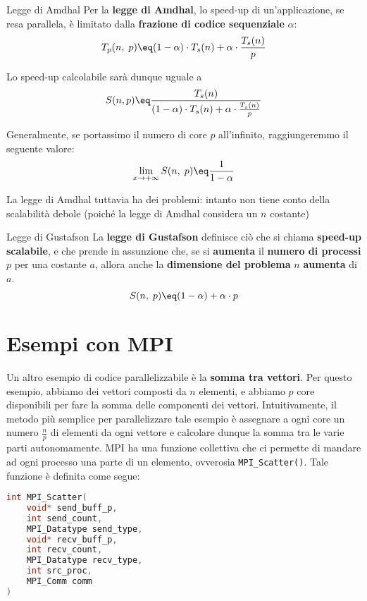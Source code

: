 \begin{definition}{Legge di Amdhal}
    Per la \textbf{legge di Amdhal}, lo speed-up di un'applicazione, se resa parallela, è limitato dalla \textbf{frazione di codice sequenziale} $\alpha$:
    \[ T_p(n, \; p) \eq (1 - \alpha) \cdot T_s(n) + \alpha \cdot \frac{T_s(n)}{p} \]

    Lo speed-up calcolabile sarà dunque uguale a
    \[ S(n, p) \eq \frac{T_s(n)}{(1 - \alpha) \cdot T_s(n) + \alpha \cdot \frac{T_s(n)}{p}} \]
\end{definition}

Generalmente, se portassimo il numero di core $p$ all'infinito, raggiungeremmo il seguente valore:
\[ \lim_{x \to +\infty} S(n, \; p) \eq \frac{1}{1 - \alpha} \]

\noindent La legge di Amdhal tuttavia ha dei problemi: intanto non tiene conto della scalabilità debole (poiché la legge di Amdhal considera un $n$ costante) %

\begin{definition}{Legge di Gustafson}
    La \textbf{legge di Gustafson} definisce ciò che si chiama \textbf{speed-up scalabile}, e che prende in assunzione che, se si \textbf{aumenta} il \textbf{numero di processi} $p$ per una costante $a$, allora anche la \textbf{dimensione del problema} $n$ \textbf{aumenta} di $a$.
    \[ S(n, \; p) \eq (1 - \alpha) + \alpha \cdot p \]
\end{definition}

\section{Esempi con MPI}


Un altro esempio di codice parallelizzabile è la \textbf{somma tra vettori}. Per questo esempio, abbiamo dei vettori composti da $n$ elementi, e abbiamo $p$ core disponibili per fare la somma delle componenti dei vettori. Intuitivamente, il metodo più semplice per parallelizzare tale esempio è assegnare a ogni core un numero $\frac{n}{p}$ di elementi da ogni vettore e calcolare dunque la somma tra le varie parti autonomamente.
\nwl
MPI ha una funzione collettiva che ci permette di mandare ad ogni processo una parte di un elemento, ovverosia \verb|MPI_Scatter()|. Tale funzione è definita come segue:

\begin{codedefine}
    \begin{lstlisting}[language = C, numbers = none]
int MPI_Scatter(
    void* send_buff_p,
    int send_count,
    MPI_Datatype send_type,
    void* recv_buff_p,
    int recv_count,
    MPI_Datatype recv_type,
    int src_proc,
    MPI_Comm comm
)\end{lstlisting}
    \tcblower
\end{codedefine}


